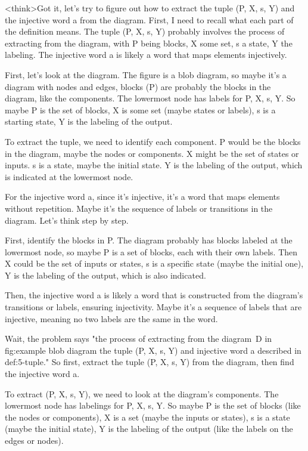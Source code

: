 <think>Got it, let's try to figure out how to extract the tuple (P, X, s, Y) and the injective word a from the diagram. First, I need to recall what each part of the definition means. The tuple (P, X, s, Y) probably involves the process of extracting from the diagram, with P being blocks, X some set, s a state, Y the labeling. The injective word a is likely a word that maps elements injectively.

First, let's look at the diagram. The figure is a blob diagram, so maybe it's a diagram with nodes and edges, blocks (P) are probably the blocks in the diagram, like the components. The lowermost node has labels for P, X, s, Y. So maybe P is the set of blocks, X is some set (maybe states or labels), s is a starting state, Y is the labeling of the output.

To extract the tuple, we need to identify each component. P would be the blocks in the diagram, maybe the nodes or components. X might be the set of states or inputs. s is a state, maybe the initial state. Y is the labeling of the output, which is indicated at the lowermost node.

For the injective word a, since it's injective, it's a word that maps elements without repetition. Maybe it's the sequence of labels or transitions in the diagram. Let's think step by step.

First, identify the blocks in P. The diagram probably has blocks labeled at the lowermost node, so maybe P is a set of blocks, each with their own labels. Then X could be the set of inputs or states, s is a specific state (maybe the initial one), Y is the labeling of the output, which is also indicated.

Then, the injective word a is likely a word that is constructed from the diagram's transitions or labels, ensuring injectivity. Maybe it's a sequence of labels that are injective, meaning no two labels are the same in the word.

Wait, the problem says "the process of extracting from the diagram~D in fig:example blob diagram the tuple (P, X, s, Y) and injective word a described in def:5-tuple." So first, extract the tuple (P, X, s, Y) from the diagram, then find the injective word a.

To extract (P, X, s, Y), we need to look at the diagram's components. The lowermost node has labelings for P, X, s, Y. So maybe P is the set of blocks (like the nodes or components), X is a set (maybe the inputs or states), s is a state (maybe the initial state), Y is the labeling of the output (like the labels on the edges or nodes).

